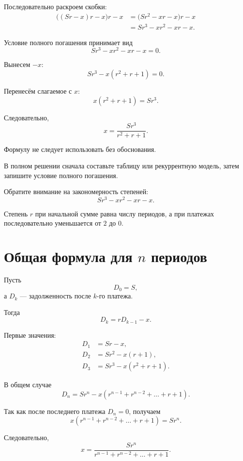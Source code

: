 \documentclass[a4paper,12pt]{article}
\begin{document}
Последовательно раскроем скобки:
\begin{align*}
\bigl((Sr-x)r-x\bigr)r-x
  &=\bigl(Sr^2-xr-x\bigr)r-x\\
  &=Sr^3-xr^2-xr-x.
\end{align*}

Условие полного погашения принимает вид
\[
Sr^3-xr^2-xr-x=0.
\]

Вынесем \(-x\):
\[
Sr^3-x(r^2+r+1)=0.
\]

Перенесём слагаемое с \(x\):
\[
x(r^2+r+1)=Sr^3.
\]

Следовательно,
\[
\boxed{
x=\frac{Sr^3}{r^2+r+1}
}.
\]

\begin{checklist}
  \item Формулу не следует использовать без обоснования.

  \item В полном решении сначала составьте таблицу или рекуррентную модель,
  затем запишите условие полного погашения.

  \item Обратите внимание на закономерность степеней:
  \[
  Sr^3-xr^2-xr-x.
  \]

  \item Степень \(r\) при начальной сумме равна числу периодов, а при
  платежах последовательно уменьшается от \(2\) до \(0\).
\end{checklist}

\section{Общая формула для \(n\) периодов}

Пусть
\[
D_0=S,
\]
а \(D_k\) --- задолженность после \(k\)-го платежа.

Тогда
\[
\boxed{D_k=rD_{k-1}-x}.
\]

Первые значения:
\begin{align*}
D_1&=Sr-x,\\
D_2&=Sr^2-x(r+1),\\
D_3&=Sr^3-x(r^2+r+1).
\end{align*}

В общем случае
\[
\boxed{
D_n=Sr^n-x\left(r^{n-1}+r^{n-2}+\dots+r+1\right)
}.
\]

Так как после последнего платежа \(D_n=0\), получаем
\[
x\left(r^{n-1}+r^{n-2}+\dots+r+1\right)=Sr^n.
\]

Следовательно,
\[
\boxed{
x=
\frac{Sr^n}
{r^{n-1}+r^{n-2}+\dots+r+1}
}.
\]
\end{document}
